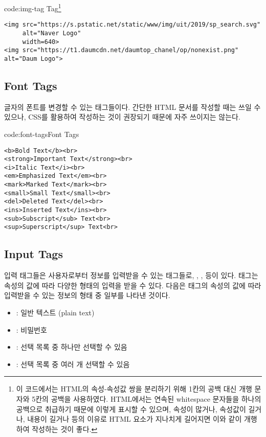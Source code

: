 \begin{codeenv}{code:img-tag}
    { Tag\footnote{이 코드에서는 HTML의 속성-속성값 쌍을 분리하기 위해 1칸의 공백 대신 개행 문자와 5칸의 공백을 사용하였다. HTML에서는 연속된 whitespace 문자들을 하나의 공백으로 취급하기 때문에 이렇게 표시할 수 있으며, 속성이 많거나, 속성값이 길거나, 내용이 길거나 등의 이유로 HTML 요소가 지나치게 길어지면 이와 같이 개행하여 작성하는 것이 좋다.}}
    \begin{verbatim}
<img src="https://s.pstatic.net/static/www/img/uit/2019/sp_search.svg"
     alt="Naver Logo"
     width=640>
<img src="https://t1.daumcdn.net/daumtop_chanel/op/nonexist.png" alt="Daum Logo">
\end{verbatim}
\end{codeenv}

\subsection*{Font Tags}
글자의 폰트를 변경할 수 있는 태그들이다. 간단한 HTML 문서를 작성할 때는 쓰일 수 있으나, CSS를 활용하여 작성하는 것이 권장되기 때문에 자주 쓰이지는 않는다.

\begin{codeenv}{code:font-tags}{Font Tags}\begin{verbatim}
<b>Bold Text</b><br>
<strong>Important Text</strong><br>
<i>Italic Text</i><br>
<em>Emphasized Text</em><br>
<mark>Marked Text</mark><br>
<small>Small Text</small><br>
<del>Deleted Text</del><br>
<ins>Inserted Text</ins><br>
<sub>Subscript</sub> Text<br>
<sup>Superscript</sup> Text<br>
\end{verbatim}
\end{codeenv}

\subsection*{Input Tags}
입력 태그들은 사용자로부터 정보를 입력받을 수 있는 태그들로, , ,  등이 있다.  태그는  속성의 값에 따라 다양한 형태의 입력을 받을 수 있다. 다음은  태그의  속성의 값에 따라 입력받을 수 있는 정보의 형태 중 일부를 나타낸 것이다.

\begin{itemize}
    \item {}: 일반 텍스트 (plain text)
    \item {}: 비밀번호
    \item {}: 선택 목록 중 하나만 선택할 수 있음
    \item {}: 선택 목록 중 여러 개 선택할 수 있음
\end{itemize}

